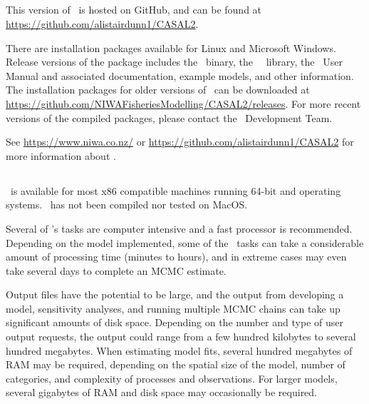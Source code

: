 \subsection{}

This version of \CNAME\ is hosted on GitHub, and can be found at \url{https://github.com/alistairdunn1/CASAL2}.

There are installation packages available for Linux and Microsoft Windows. Release versions of the package includes the \CNAME\ binary, the \CNAME\ \R\ library, the \CNAME\ User Manual and associated documentation, example models, and other information. The installation packages for older versions of \CNAME\ can be downloaded at \url{https://github.com/NIWAFisheriesModelling/CASAL2/releases}. For more recent versions of the compiled packages, please contact the \CNAME\ Development Team. 

See \url{https://www.niwa.co.nz/} or \url{https://github.com/alistairdunn1/CASAL2} for more information about \CNAME.

\subsection{}

\CNAME\ is available for most x86 compatible machines running 64-bit  and  operating systems. \CNAME\ has not been compiled nor tested on MacOS.

Several of \CNAME's tasks are computer intensive and a fast processor is recommended. Depending on the model implemented, some of the \CNAME\ tasks can take a considerable amount of processing time (minutes to hours), and in extreme cases may even take several days to complete an MCMC estimate.

Output files have the potential to be large, and the output from developing a model, sensitivity analyses, and running multiple MCMC chains can take up significant amounts of disk space. Depending on the number and type of user output requests, the output could range from a few hundred kilobytes to several hundred megabytes. When estimating model fits, several hundred megabytes of RAM may be required, depending on the spatial size of the model, number of categories, and complexity of processes and observations. For larger models, several gigabytes of RAM and disk space may occasionally be required.

\subsection{}

